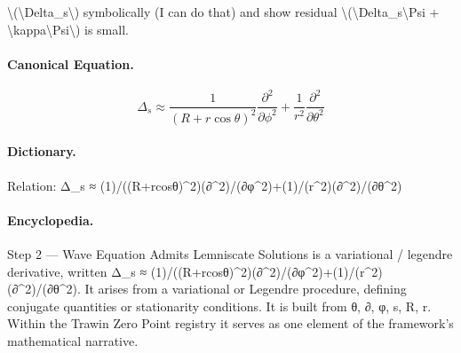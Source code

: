 \textbackslash{}(\textbackslash{}Delta\_s\textbackslash{}) symbolically (I can do that) and show residual \textbackslash{}(\textbackslash{}Delta\_s\textbackslash{}Psi + \textbackslash{}kappa\textbackslash{}Psi\textbackslash{}) is small.

\paragraph{Canonical Equation.}
\[
\Delta_s \approx \frac{1}{(R+r\cos\theta)^2}\frac{\partial^2}{\partial\phi^2}+\frac{1}{r^2}\frac{\partial^2}{\partial\theta^2}
\]

\paragraph{Dictionary.}
Relation: Δ\_s ≈ (1)/((R+rcosθ)\textasciicircum{}2)(∂\textasciicircum{}2)/(∂φ\textasciicircum{}2)+(1)/(r\textasciicircum{}2)(∂\textasciicircum{}2)/(∂θ\textasciicircum{}2)

\paragraph{Encyclopedia.}
Step 2 — Wave Equation Admits Lemniscate Solutions is a variational / legendre derivative, written Δ\_s ≈ (1)/((R+rcosθ)\textasciicircum{}2)(∂\textasciicircum{}2)/(∂φ\textasciicircum{}2)+(1)/(r\textasciicircum{}2)(∂\textasciicircum{}2)/(∂θ\textasciicircum{}2). It arises from a variational or Legendre procedure, defining conjugate quantities or stationarity conditions. It is built from θ, ∂, φ, s, R, r. Within the Trawin Zero Point registry it serves as one element of the framework's mathematical narrative.
